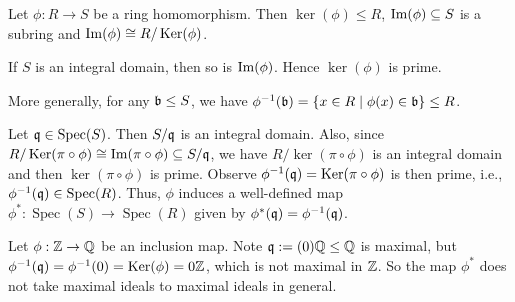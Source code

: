 \begin{fact}
    Let $\phi: R \to S$ be a ring homomorphism. Then $\ker(\phi) \leq R$, $\operatorname{Im}(\phi) \subseteq S$ is a subring and $\operatorname{Im}(\phi) \cong R/\operatorname{Ker}(\phi)$. \par 
    If $S$ is an integral domain, then so is $\operatorname{Im}(\phi)$. Hence $\ker(\phi)$ is prime. \par
    More generally, for any $\mathfrak{b} \leq S$, we have $\phi^{-1}(\mathfrak{b}) = \{x \in R \mid \phi(x) \in \mathfrak{b}\} \leq R$.
    \begin{center}
    \end{center}
    \par
    Let $\mathfrak{q} \in \operatorname{Spec}(S)$. Then $S/\mathfrak{q}$ is an integral domain. Also, since $R/\operatorname{Ker}(\pi \circ \phi) \cong \operatorname{Im}(\pi \circ \phi) \subseteq S/\mathfrak{q}$, we have $R/\ker(\pi \circ \phi)$ is an integral domain and then $\ker(\pi \circ \phi)$ is prime. Observe $\phi^{-1}(\mathfrak{q}) = \operatorname{Ker}(\pi \circ \phi)$ is then prime, i.e., $\phi^{-1}(\mathfrak{q}) \in \operatorname{Spec}(R)$. Thus, $\phi$ induces a well-defined map $\phi^*: \operatorname{Spec}(S) \to \operatorname{Spec}(R)$ given by $\phi^*(\mathfrak{q}) = \phi^{-1}(\mathfrak{q})$.
    \end{fact}

\begin{example*}
    Let $\phi: \mathbb{Z} \to \mathbb{Q}$ be an inclusion map. Note $\mathfrak{q} := (0)\mathbb{Q} \leq \mathbb{Q}$ is maximal, but $\phi^{-1}(\mathfrak{q}) = \phi^{-1}(0) = \operatorname{Ker}(\phi) = 0 \mathbb{Z}$, which is not maximal in $\mathbb{Z}$. So the map $\phi^*$ does not take maximal ideals to maximal ideals in general.
\end{example*}

